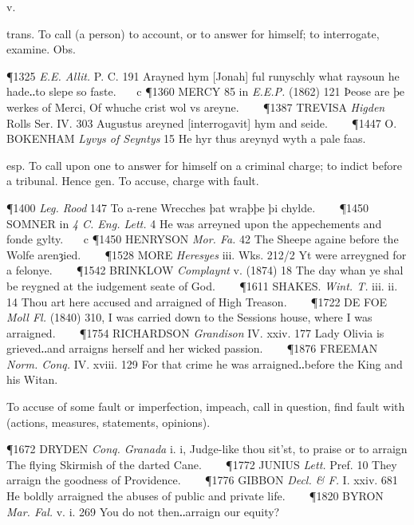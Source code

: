 \begin{description}[wide, labelwidth=!, labelindent=0pt]
 v.

\noindent {}


\begin{myenumerate}

 trans. To call (a person) to account, or to answer for himself; to interrogate, examine. Obs.

\P 1325  \textit{E.E. Allit.} P. C. 191 Arayned hym [Jonah] ful runyschly what raysoun he hade‥to slepe so faste.    c 
\P 1360 MERCY 85 in  \textit{E.E.P.} (1862) 121 Þeose are þe werkes of Merci, Of whuche crist wol vs areyne.    
\P 1387 TREVISA  \textit{Higden} Rolls Ser. IV. 303 Augustus areyned [interrogavit] hym and seide.    
\P 1447 O. BOKENHAM  \textit{Lyvys of Seyntys} 15 He hyr thus areynyd wyth a pale faas.

 esp. To call upon one to answer for himself on a criminal charge; to indict before a tribunal. Hence gen. To accuse, charge with fault.

\P 1400  \textit{Leg. Rood} 147 To a-rene Wrecches þat wraþþe þi chylde.    
\P 1450 SOMNER in  \textit{4 C. Eng. Lett.} 4 He was arreyned upon the appechements and fonde gylty.    c 
\P 1450 HENRYSON  \textit{Mor. Fa.} 42 The Sheepe againe before the Wolfe arenȝied.    
\P 1528 MORE  \textit{Heresyes} iii. Wks. 212/2 Yt were arreygned for a felonye.    
\P 1542 BRINKLOW  \textit{Complaynt} v. (1874) 18 The day whan ye shal be reygned at the iudgement seate of God.    
\P 1611 SHAKES.  \textit{Wint. T.} iii. ii. 14 Thou art here accused and arraigned of High Treason.    
\P 1722 DE FOE  \textit{Moll Fl.} (1840) 310, I was carried down to the Sessions house, where I was arraigned.    
\P 1754 RICHARDSON  \textit{Grandison} IV. xxiv. 177 Lady Olivia is grieved‥and arraigns herself and her wicked passion.    
\P 1876 FREEMAN  \textit{Norm. Conq.} IV. xviii. 129 For that crime he was arraigned‥before the King and his Witan.

 To accuse of some fault or imperfection, impeach, call in question, find fault with (actions, measures, statements, opinions).

\P 1672 DRYDEN  \textit{Conq. Granada} i. i, Judge-like thou sit'st, to praise or to arraign The flying Skirmish of the darted Cane.    
\P 1772 JUNIUS  \textit{Lett.} Pref. 10 They arraign the goodness of Providence.    
\P 1776 GIBBON  \textit{Decl. \& F.} I. xxiv. 681 He boldly arraigned the abuses of public and private life.    
\P 1820 BYRON  \textit{Mar. Fal.} v. i. 269 You do not then‥arraign our equity?


\end{myenumerate}
\end{description}
